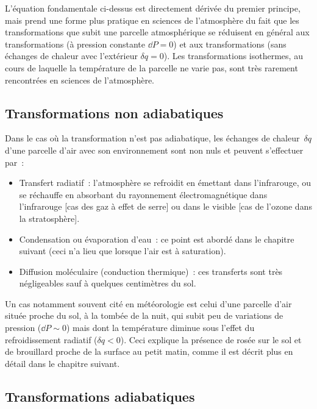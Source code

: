 \sk
L'équation fondamentale ci-dessus est directement dérivée du premier principe, mais prend une forme plus pratique en sciences de l'atmosphère du fait que les transformations que subit une parcelle atmosphérique se réduisent en général aux transformations  (à pression constante $\dd P = 0$) et aux transformations  (sans échanges de chaleur avec l'extérieur $\delta q = 0$). Les transformations isothermes, au cours de laquelle la température de la parcelle ne varie pas, sont très rarement rencontrées en sciences de l'atmosphère.

\sk
\subsection{Transformations non adiabatiques}

\sk
Dans le cas où la transformation n'est pas adiabatique, les échanges de chaleur~$\delta q$ d'une parcelle d'air avec son environnement sont non nuls et peuvent s'effectuer par~:
\begin{itemize}
\item Transfert radiatif~: l'atmosphère se refroidit en émettant dans l'infrarouge, ou se réchauffe en absorbant du rayonnement électromagnétique dans l'infrarouge [cas des gaz à effet de serre] ou dans le visible [cas de l'ozone dans la stratosphère].
\item Condensation ou évaporation d'eau~: ce point est abordé dans le chapitre suivant (ceci n'a lieu que lorsque l'air est à saturation).
\item Diffusion moléculaire (conduction thermique)~: ces transferts sont très négligeables sauf à quelques centimètres du sol.
\end{itemize}
Un cas notamment souvent cité en météorologie est celui d'une parcelle d'air située proche du sol, à la tombée de la nuit, qui subit peu de variations de pression ($\dd P \sim 0$) mais dont la température diminue sous l'effet du refroidissement radiatif ($\delta q < 0$). Ceci explique la présence de rosée sur le sol et de brouillard proche de la surface au petit matin, comme il est décrit plus en détail dans le chapitre suivant.

\sk
\subsection{Transformations adiabatiques}

